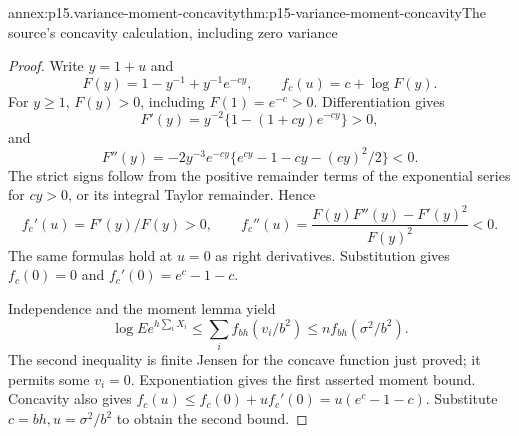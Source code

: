 \begin{annexitem}{annex:p15.variance-moment-concavity}{thm:p15-variance-moment-concavity}{The source's concavity calculation, including zero variance}
\begin{proof}
Write \(y=1+u\) and
\[
 F(y)=1-y^{-1}+y^{-1}e^{-cy},\qquad f_c(u)=c+\log F(y).
\]
For \(y\geq1\), \(F(y)>0\), including \(F(1)=e^{-c}>0\).
Differentiation gives
\[
 F'(y)=y^{-2}\{1-(1+cy)e^{-cy}\}>0,
\]
and
\[
 F''(y)=-2y^{-3}e^{-cy}
       \{e^{cy}-1-cy-(cy)^2/2\}<0.
\]
The strict signs follow from the positive remainder terms of the
exponential series for \(cy>0\), or its integral Taylor remainder.
Hence
\[
 f_c'(u)=F'(y)/F(y)>0,\qquad
 f_c''(u)=\frac{F(y)F''(y)-F'(y)^2}{F(y)^2}<0.
\]
The same formulas hold at \(u=0\) as right derivatives. Substitution
gives \(f_c(0)=0\) and \(f_c'(0)=e^c-1-c\).

Independence and the moment lemma yield
\[
 \log E e^{h\sum_iX_i}
 \leq\sum_i f_{bh}(v_i/b^2)
 \leq n f_{bh}(\sigma^2/b^2).
\]
The second inequality is finite Jensen for the concave function just
proved; it permits some \(v_i=0\).
Exponentiation gives the first asserted moment bound.
Concavity also gives
\(f_c(u)\leq f_c(0)+u f_c'(0)=u(e^c-1-c)\).
Substitute \(c=bh,u=\sigma^2/b^2\) to obtain the second bound.
\end{proof}
\end{annexitem}

